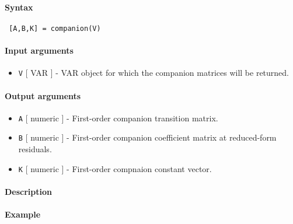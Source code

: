 


	\paragraph{Syntax}
 
 \begin{verbatim}
 [A,B,K] = companion(V)
 \end{verbatim}
 
 \paragraph{Input arguments}
 
 \begin{itemize}
 \item
   \texttt{V} {[} VAR {]} - VAR object for which the companion matrices
   will be returned.
 \end{itemize}
 
 \paragraph{Output arguments}
 
 \begin{itemize}
 \item
   \texttt{A} {[} numeric {]} - First-order companion transition matrix.
 \item
   \texttt{B} {[} numeric {]} - First-order companion coefficient matrix
   at reduced-form residuals.
 \item
   \texttt{K} {[} numeric {]} - First-order compnaion constant vector.
 \end{itemize}
 
 \paragraph{Description}
 
 \paragraph{Example}


